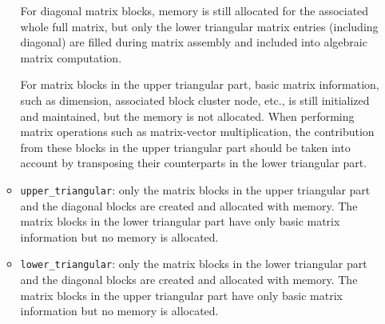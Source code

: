\documentclass[11pt, a4paper]{book}
\begin{document}
\begin{enumerate}
\begin{itemize}
    For diagonal matrix blocks, memory is still allocated for the associated whole full
    matrix, but only the lower triangular matrix entries (including diagonal) are filled
    during matrix assembly and included into algebraic matrix computation.

    For matrix blocks in the upper triangular part, basic matrix information, such as
    dimension, associated block cluster node, etc., is still initialized and maintained,
    but the memory is not allocated. When performing matrix operations such as
    matrix-vector multiplication, the contribution from these blocks in the upper
    triangular part should be taken into account by transposing their counterparts in the
    lower triangular part.
  \item \texttt{upper\_triangular}: only the matrix blocks in the upper triangular part and
    the diagonal blocks are created and allocated with memory. The matrix blocks in the
    lower triangular part have only basic matrix information but no memory is allocated.
  \item \texttt{lower\_triangular}: only the matrix blocks in the lower triangular part and
    the diagonal blocks are created and allocated with memory. The matrix blocks in the
    upper triangular part have only basic matrix information but no memory is allocated.
  \end{itemize}
\end{enumerate}
\end{document}
